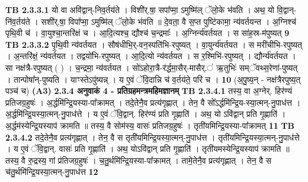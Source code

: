 \documentclass[17pt]{extarticle}
\begin{document}
                                \textbf{ TB 2.3.3.1} \newline
                  यो वा अवि॑द्वान्-निव॒र्तय॑ते । विशी॑र्.षा॒ सपा᳚प्मा॒ ऽमुष्मि॑ल् ॅलो॒के भ॑वति । अथ॒ यो वि॒द्वान्-नि॑व॒र्तय॑ते । सशी॑र्.षा॒ विपा᳚प्मा॒ ऽमुष्मि॑ल् ॅलो॒के भ॑वति ॥ दे॒वता॒ वै स॒प्त पुष्टि॑कामा॒ न्य॑वर्तयन्त । अ॒ग्निश्च॑ पृथि॒वी च॑ । वा॒युश्चा॒न्तरि॑क्षं च । आ॒दि॒त्यश्च॒ द्यौश्च॑ च॒न्द्रमाः᳚ । अ॒ग्निर्न्य॑वर्तयत । स सा॑ह॒स्र-म॑पुष्यत् \textbf{ 9} \newline
                  \newline
                                \textbf{ TB 2.3.3.2} \newline
                  पृ॒थि॒वी न्य॑वर्तयत । सौष॑धीभि॒र्-वन॒स्पति॑भि-रपुष्यत् । वा॒युर्न्य॑वर्तयत । स मरी॑चीभि-रपुष्यत् । अ॒न्तरि॑क्षं॒ न्य॑वर्तयत । तद्वयो॑भि-रपुष्यत् । आ॒दि॒त्यो न्य॑वर्तयत । स र॒श्मिभि॑-रपुष्यत् । द्यौर्न्य॑वर्तयत । सा नक्ष॑त्रै-रपुष्यत् ( ) । च॒न्द्रमा॒ न्य॑वर्तयत । सो॑ऽहोरा॒त्रै-र॑र्द्धमा॒सैर्-मासैर्.॑ ऋ॒तुभिः॑ सम्ॅवथ्स॒रेणा॑-पुष्यत् । तान्पोषा᳚न्-पुष्यति । याꣳस्तेऽपु॑ष्यन्न् । य ए॒वं ॅवि॒दान्नि च॑ व॒र्तय॑ते॒ परि॑ च । \textbf{ 10} \newline
                  \newline
                                    (अ॒पु॒ष्य॒न् - नक्ष॑त्रैरपुष्य॒त् पञ्च॑ च) \textbf{(A3)} \newline \newline
                \textbf{ 2.3.4      अनुवाकं   4 - प्रतिग्रहमन्त्रमहिमज्ञानम्} \newline
                                \textbf{ TB 2.3.4.1} \newline
                  तस्य॒ वा अ॒ग्नेर्. हिर॑ण्यं प्रतिजग्र॒हुषः॑ । अ॒र्द्धमि॑न्द्रि॒यस्या-पा᳚क्रामत् । तदे॒तेनै॒व प्रत्य॑गृह्णात् । तेन॒ वै सो᳚ऽर्द्धमि॑न्द्रि॒य-स्या॒त्मन्-नु॒पाध॑त्त । अ॒र्द्धमि॑न्द्रि॒यस्या॒त्मन्-नु॒पाध॑त्ते । य ए॒वं ॅवि॒द्वान्. हिर॑ण्यं प्रति गृ॒ह्णाति॑ । अथ॒ यो ऽवि॑द्वान् प्रति गृ॒ह्णाति॑ । अ॒र्द्धम॑स्येन्द्रि॒यस्याप॑ क्रामति ॥ तस्य॒ वै सोम॑स्य॒ वासः॑ प्रतिजग्र॒हुषः॑ । तृती॑यमिन्द्रि॒यस्या-पा᳚क्रामत् \textbf{ 11} \newline
                  \newline
                                \textbf{ TB 2.3.4.2} \newline
                  तदे॒तेनै॒व प्रत्य॑गृह्णात् । तेन॒ वै स तृती॑यमिन्द्रि॒यस्या॒त्मन्-नु॒पाध॑त्त । तृती॑यमिन्द्रि॒यस्या॒त्मन्-नु॒पाध॑त्ते । य ए॒वं ॅवि॒द्वान्. वासः॑ प्रति गृ॒ह्णाति॑ । अथ॒ योऽवि॑द्वान् प्रति गृ॒ह्णाति॑ । तृती॑यमस्येन्द्रि॒यस्याप॑ क्रामति ॥ तस्य॒ वै रु॒द्रस्य॒ गां प्र॑तिजग्र॒हुषः॑ । च॒तु॒र्थमि॑न्द्रि॒यस्या-पा᳚क्रामत् । तामे॒तेनै॒व प्रत्य॑गृह्णात् । तेन॒ वै स च॑तु॒र्थमि॑न्द्रि॒यस्या॒त्मन्-नु॒पाध॑त्त \textbf{ 12} \newline
\end{document}

